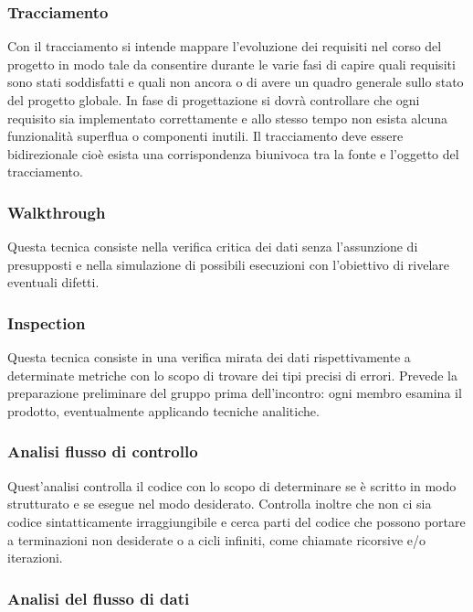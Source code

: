 \subsubsection*{Tracciamento}

Con il tracciamento si intende mappare l'evoluzione dei requisiti nel corso del
progetto in modo tale da consentire durante le varie fasi di capire quali
requisiti sono stati soddisfatti e quali non ancora o di avere un quadro
generale sullo stato del progetto globale. In fase di progettazione si dovr\`a
controllare che ogni requisito sia implementato correttamente e allo stesso
tempo non esista alcuna funzionalit\`a superflua o componenti inutili. Il
tracciamento deve essere bidirezionale cio\`e esista una
corrispondenza biunivoca tra la fonte e l'oggetto del tracciamento.

\subsubsection*{Walkthrough}

Questa tecnica consiste nella verifica critica dei dati senza
l'assunzione di presupposti e nella simulazione di possibili esecuzioni con l'obiettivo
di rivelare eventuali difetti.

\subsubsection*{Inspection}

Questa tecnica consiste in una verifica mirata dei dati rispettivamente a
determinate metriche con lo scopo di trovare dei tipi precisi di errori.
Prevede la preparazione preliminare del gruppo prima dell'incontro: ogni membro esamina il prodotto, eventualmente applicando tecniche analitiche.

\subsubsection*{Analisi flusso di controllo}

Quest'analisi controlla il codice con lo scopo di determinare se \`e scritto in
modo strutturato e se esegue nel modo desiderato. Controlla inoltre che non ci
sia codice sintatticamente irraggiungibile e cerca parti del codice che possono
portare a terminazioni non desiderate o a cicli infiniti, come chiamate
ricorsive e/o iterazioni.

\subsubsection*{Analisi del flusso di dati}

